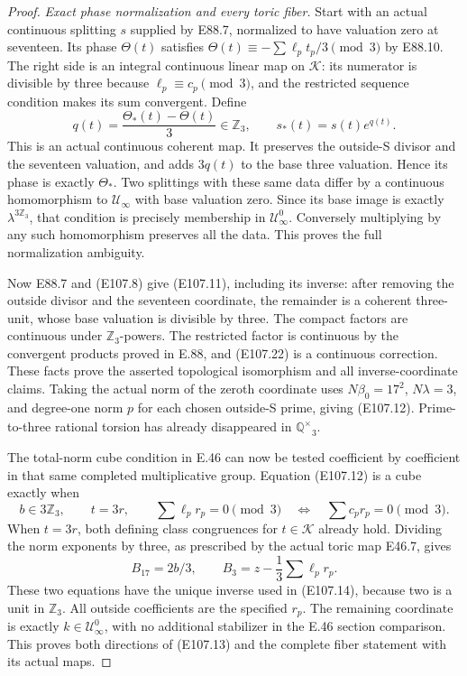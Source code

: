 \begin{proof}
\emph{Exact phase normalization and every toric fiber.}
Start with an actual continuous splitting \(s\) supplied by
E88.7, normalized to have valuation zero at seventeen.
Its phase \(\Theta(t)\) satisfies
\(\Theta(t)\equiv-\sum\ell_pt_p/3\pmod3\) by E88.10.
The right side is an integral continuous linear map on
\(\mathcal K\): its numerator is divisible by three because
\(\ell_p\equiv c_p\pmod3\), and the restricted sequence
condition makes its sum convergent. Define
\[
  q(t)=\frac{\Theta_*(t)-\Theta(t)}3\in\mathbb Z_3,\qquad
                s_*(t)=s(t)e^{q(t)} .
 \tag{E107.22}
\]
This is an actual continuous coherent map. It preserves the
outside-S divisor and the seventeen valuation, and adds \(3q(t)\)
to the base three valuation. Hence its phase is exactly \(\Theta_*\).
Two splittings with these same data differ by a continuous
homomorphism to \(\mathcal U_\infty\) with base valuation zero.
Since its base image is exactly \(\lambda^{3\mathbb Z_3}\),
that condition is precisely membership in \(\mathcal U_\infty^0\).
Conversely multiplying by any such homomorphism preserves all
the data. This proves the full normalization ambiguity.

Now E88.7 and (E107.8) give (E107.11), including its inverse:
after removing the outside divisor and the seventeen coordinate,
the remainder is a coherent three-unit, whose base valuation is
divisible by three. The compact factors are continuous under
\(\mathbb Z_3\)-powers. The restricted factor is continuous by
the convergent products proved in E.88, and (E107.22) is a
continuous correction. These facts prove the asserted
topological isomorphism and all inverse-coordinate claims.
Taking the actual norm of the zeroth coordinate uses
\(N\beta_0=17^2\), \(N\lambda=3\), and degree-one norm \(p\)
for each chosen outside-S prime, giving (E107.12).
Prime-to-three rational torsion has already disappeared in
\(\widehat{\mathbb Q^\times}_3\).

The total-norm cube condition in E.46 can now be tested
coefficient by coefficient in that same completed multiplicative
group. Equation (E107.12) is a cube exactly when
\[
 b\in3\mathbb Z_3,\qquad t=3r,\qquad
 \sum\ell_pr_p=0\pmod3
       \quad\Longleftrightarrow\quad \sum c_pr_p=0\pmod3 .
 \tag{E107.23}
\]
When \(t=3r\), both defining class congruences for \(t\in\mathcal K\)
already hold. Dividing the norm exponents by three, as prescribed
by the actual toric map E46.7, gives
\[
       B_{17}=2b/3,\qquad
       B_3=z-\frac13\sum\ell_pr_p .
 \tag{E107.24}
\]
These two equations have the unique inverse used in (E107.14),
because two is a unit in \(\mathbb Z_3\).
All outside coefficients are the specified \(r_p\).
The remaining coordinate is exactly \(k\in\mathcal U_\infty^0\),
with no additional stabilizer in the E.46 section comparison.
This proves both directions of (E107.13) and the complete
fiber statement with its actual maps.


\end{proof}
